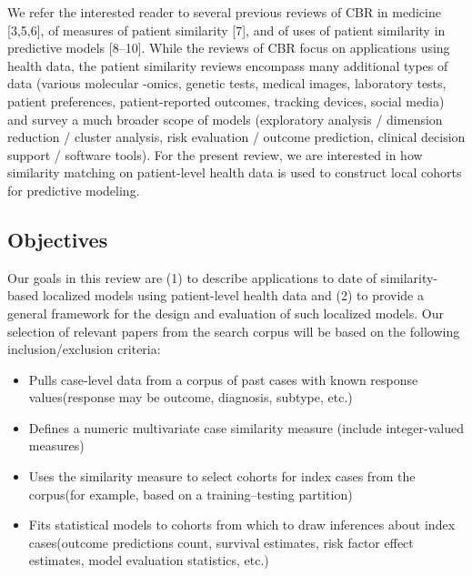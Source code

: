 \documentclass[preprint, 3p,
authoryear]{elsarticle} %
\providecommand{\tightlist}{%
  \setlength{\itemsep}{0pt}\setlength{\parskip}{0pt}}
\begin{document}
We refer the interested reader to several previous reviews of CBR in
medicine {[}3,5,6{]}, of measures of patient similarity {[}7{]}, and of
uses of patient similarity in predictive models {[}8--10{]}. While the
reviews of CBR focus on applications using health data, the patient
similarity reviews encompass many additional types of data (various
molecular -omics, genetic tests, medical images, laboratory tests,
patient preferences, patient-reported outcomes, tracking devices, social
media) and survey a much broader scope of models (exploratory analysis /
dimension reduction / cluster analysis, risk evaluation / outcome
prediction, clinical decision support / software tools). For the present
review, we are interested in how similarity matching on patient-level
health data is used to construct local cohorts for predictive modeling.

\hypertarget{objectives}{%
\subsection{Objectives}\label{objectives}}

Our goals in this review are (1) to describe applications to date of
similarity-based localized models using patient-level health data and
(2) to provide a general framework for the design and evaluation of such
localized models. Our selection of relevant papers from the search
corpus will be based on the following inclusion/exclusion criteria:

\begin{itemize}
\tightlist
\item
  Pulls case-level data from a corpus of past cases with known response
  values\newline (response may be outcome, diagnosis, subtype, etc.)
\item
  Defines a numeric multivariate case similarity measure\newline
  (include integer-valued measures)
\item
  Uses the similarity measure to select cohorts for index cases from the
  corpus\newline (for example, based on a training--testing partition)
\item
  Fits statistical models to cohorts from which to draw inferences about
  index cases\newline (outcome predictions count, survival estimates,
  risk factor effect estimates, model evaluation statistics, etc.)
\end{itemize}
\end{document}
